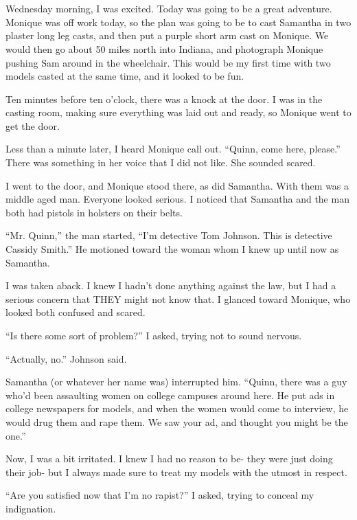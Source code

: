 \chapter{~}
Wednesday morning, I was excited. Today was going to be a great adventure. Monique was off
work today, so the plan was going to be to cast Samantha in two plaster long leg casts, and then
put a purple short arm cast on Monique. We would then go about 50 miles north into Indiana, and
photograph Monique pushing Sam around in the wheelchair. This would be my first time with two
models casted at the same time, and it looked to be fun.

Ten minutes before ten o'clock, there was a knock at the door. I was in the casting room,
making sure everything was laid out and ready, so Monique went to get the door.

Less than a minute later, I heard Monique call out. ``Quinn, come here, please.'' There was
something in her voice that I did not like. She sounded scared.

I went to the door, and Monique stood there, as did Samantha. With them was a middle aged
man. Everyone looked serious. I noticed that Samantha and the man both had pistols in holsters
on their belts.

``Mr. Quinn,'' the man started, ``I'm detective Tom Johnson. This is detective Cassidy Smith.''
He motioned toward the woman whom I knew up until now as Samantha.

I was taken aback. I knew I hadn't done anything against the law, but I had a serious
concern that THEY might not know that. I glanced toward Monique, who looked both confused and
scared.

``Is there some sort of problem?'' I asked, trying not to sound nervous.

``Actually, no.'' Johnson said.

Samantha (or whatever her name was) interrupted him. ``Quinn, there was a guy who'd been
assaulting women on college campuses around here. He put ads in college newspapers for models,
and when the women would come to interview, he would drug them and rape them. We saw your ad,
and thought you might be the one.''

Now, I was a bit irritated. I knew I had no reason to be- they were just doing their job-
but I always made sure to treat my models with the utmost in respect.

``Are you satisfied now that I'm no rapist?'' I asked, trying to conceal my indignation.

